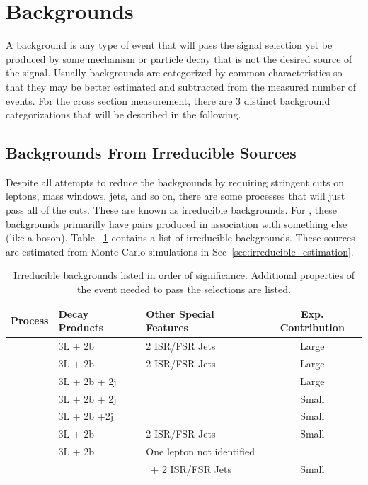 	\section{Backgrounds}
	\label{sec:background_sources}
	A background is any type of event that will pass the signal selection yet be produced by some mechanism or particle decay that is not the desired source of the signal. Usually backgrounds are categorized by common characteristics so that they may be better estimated and subtracted from the measured number of events. For the \ttZ cross section measurement, there are 3 distinct background categorizations that will be described in the following.
	
	        		\subsection{Backgrounds From Irreducible Sources} 
	Despite all attempts to reduce the backgrounds by requiring stringent cuts on leptons, mass windows, jets, and so on, there are some processes that will just pass all of the cuts. These are known as irreducible backgrounds. For \ttZ, these backgrounds primarilly have \ttbar pairs produced in association with something else (like a boson). Table ~\ref{tab:irreducible_bkg} contains a list of irreducible backgrounds. These sources are estimated from Monte Carlo simulations in Sec~\ref{sec:irreducible_estimation}.
	\begin{table}[hbt]
	\caption{\label{tab:irreducible_bkg} Irreducible backgrounds listed in order of significance. Additional properties of the event needed to pass the selections are listed.}
	\begin{center}
	\begin{tabular}{l|ll|c}\hline\hline %
	Process & Decay Products & Other Special Features & Exp. Contribution\\
	\hline
	\ttW & 3L + 2b& 2 ISR/FSR Jets& Large\\
	\tbZ & 3L + 2b& 2 ISR/FSR Jets & Large\\
	\ttH & 3L + 2b + 2j & & Large \\
	\ttG & 3L + 2b + 2j & & Small \\
	\ttWW & 3L + 2b +2j& & Small\\
	\WZZ & 3L + 2b & 2 ISR/FSR Jets & Small\\
	\ZZZ & 3L + 2b & One lepton not identified\\ 
	         &               & \ + 2 ISR/FSR Jets & Small\\
	
	\hline \hline
	\end{tabular}
	
	\end{center}
	\end{table}
	
